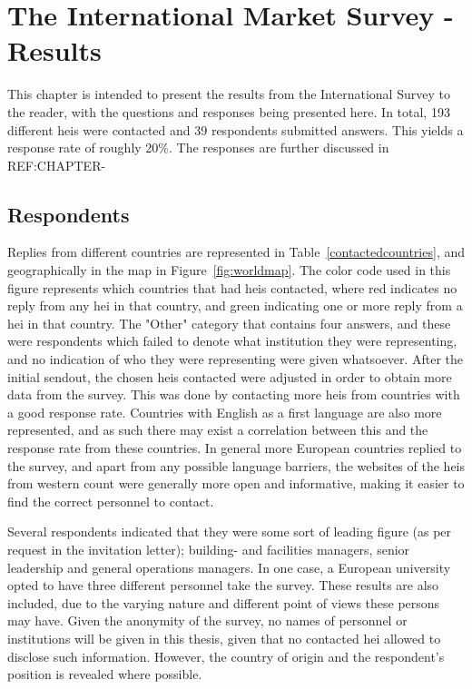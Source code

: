 \chapter{The International Market Survey - Results}
\renewcommand{\arraystretch}{1.5}
This chapter is intended to present the results from the International Survey to the reader, with the questions and responses being presented here. In total, 193 different \glspl{hei} were contacted and 39 respondents submitted answers. This yields a response rate of roughly 20\%. The responses are further discussed in REF:CHAPTER-
\section{Respondents}
Replies from different countries are represented in Table~\ref{contactedcountries}, and geographically in the map in Figure~\ref{fig:worldmap}. The color code used in this figure represents which countries that had \glspl{hei} contacted, where red indicates no reply from any \gls{hei} in that country, and green indicating one or more reply from a \gls{hei} in that country. The "Other" category that contains four answers, and these were respondents which failed to denote what institution they were representing, and no indication of who they were representing were given whatsoever. After the initial sendout, the chosen \glspl{hei} contacted were adjusted in order to obtain more data from the survey. This was done by contacting more \glspl{hei} from countries with a good response rate. Countries with English as a first language are also more represented, and as such there may exist a correlation between this and the response rate from these countries. In general more European countries replied to the survey, and apart from any possible language barriers, the websites of the \glspl{hei} from western count were generally more open and informative, making it easier to find the correct personnel to contact. 


Several respondents indicated that they were some sort of leading figure (as per request in the invitation letter); building- and facilities managers, senior leadership and general operations managers. In one case, a European university opted to have three different personnel take the survey. These results are also included, due to the varying nature and different point of views these persons may have. Given the anonymity of the survey, no names of personnel or institutions will be given in this thesis, given that no contacted \gls{hei} allowed to disclose such information. However, the country of origin and the respondent's position is revealed where possible. 


